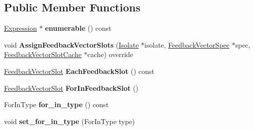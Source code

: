 \subsection*{Public Member Functions}
\begin{DoxyCompactItemize}
\item 
\hyperlink{classv8_1_1internal_1_1_expression}{Expression} $\ast$ {\bfseries enumerable} () const \hypertarget{classv8_1_1internal_1_1_for_in_statement_ab84dbf18ced634f9905d2b280ada1340}{}\label{classv8_1_1internal_1_1_for_in_statement_ab84dbf18ced634f9905d2b280ada1340}

\item 
void {\bfseries Assign\+Feedback\+Vector\+Slots} (\hyperlink{classv8_1_1internal_1_1_isolate}{Isolate} $\ast$isolate, \hyperlink{classv8_1_1internal_1_1_feedback_vector_spec}{Feedback\+Vector\+Spec} $\ast$spec, \hyperlink{classv8_1_1internal_1_1_feedback_vector_slot_cache}{Feedback\+Vector\+Slot\+Cache} $\ast$cache) override\hypertarget{classv8_1_1internal_1_1_for_in_statement_ace323b1dbab734b097359b597bca3e8c}{}\label{classv8_1_1internal_1_1_for_in_statement_ace323b1dbab734b097359b597bca3e8c}

\item 
\hyperlink{classv8_1_1internal_1_1_feedback_vector_slot}{Feedback\+Vector\+Slot} {\bfseries Each\+Feedback\+Slot} () const \hypertarget{classv8_1_1internal_1_1_for_in_statement_af549793bc510262c19c0b519fc4574e3}{}\label{classv8_1_1internal_1_1_for_in_statement_af549793bc510262c19c0b519fc4574e3}

\item 
\hyperlink{classv8_1_1internal_1_1_feedback_vector_slot}{Feedback\+Vector\+Slot} {\bfseries For\+In\+Feedback\+Slot} ()\hypertarget{classv8_1_1internal_1_1_for_in_statement_a90ed174dd121d9a22c6852666381826c}{}\label{classv8_1_1internal_1_1_for_in_statement_a90ed174dd121d9a22c6852666381826c}

\item 
For\+In\+Type {\bfseries for\+\_\+in\+\_\+type} () const \hypertarget{classv8_1_1internal_1_1_for_in_statement_a56485a8d979bc87a0a962b5861f21eb4}{}\label{classv8_1_1internal_1_1_for_in_statement_a56485a8d979bc87a0a962b5861f21eb4}

\item 
void {\bfseries set\+\_\+for\+\_\+in\+\_\+type} (For\+In\+Type type)\hypertarget{classv8_1_1internal_1_1_for_in_statement_aa40822816fc66fcec6b49368415967c4}{}\label{classv8_1_1internal_1_1_for_in_statement_aa40822816fc66fcec6b49368415967c4}


\end{DoxyCompactItemize}
